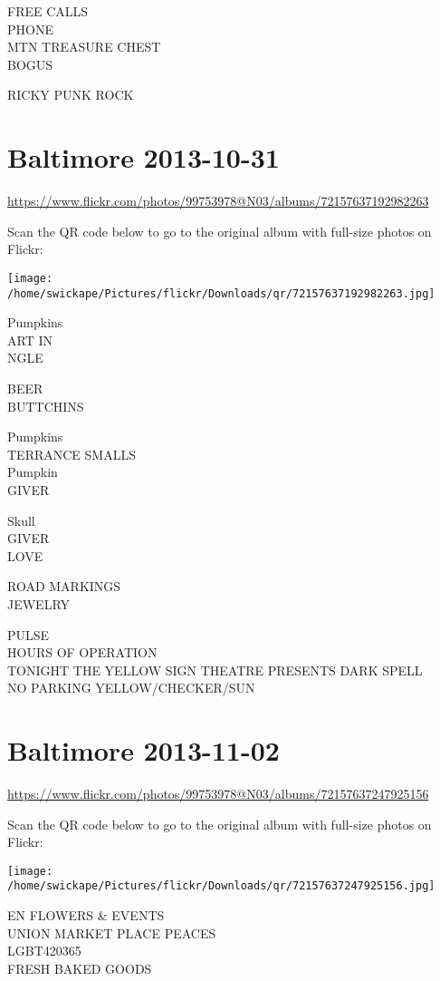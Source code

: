 \documentclass[10pt,letterpaper]{article}
\begin{document}
FREE CALLS\\
PHONE\\
MTN TREASURE CHEST\\
BOGUS

RICKY PUNK ROCK


\section*{Baltimore 2013-10-31}

\url{https://www.flickr.com/photos/99753978@N03/albums/72157637192982263}

Scan the QR code below to go to the original album with full-size photos on Flickr:

\texttt{[image: /home/swickape/Pictures/flickr/Downloads/qr/72157637192982263.jpg]}


Pumpkins\\
ART IN\\
NGLE

BEER\\
BUTTCHINS

Pumpkins\\
TERRANCE SMALLS\\
Pumpkin\\
GIVER

Skull\\
GIVER\\
LOVE

ROAD MARKINGS\\
JEWELRY

PULSE\\
HOURS OF OPERATION\\
TONIGHT THE YELLOW SIGN THEATRE PRESENTS DARK SPELL\\
NO PARKING YELLOW/CHECKER/SUN


\section*{Baltimore 2013-11-02}

\url{https://www.flickr.com/photos/99753978@N03/albums/72157637247925156}

Scan the QR code below to go to the original album with full-size photos on Flickr:

\texttt{[image: /home/swickape/Pictures/flickr/Downloads/qr/72157637247925156.jpg]}


EN FLOWERS \& EVENTS\\
UNION MARKET PLACE PEACES\\
LGBT420365\\
FRESH BAKED GOODS
\end{document}
